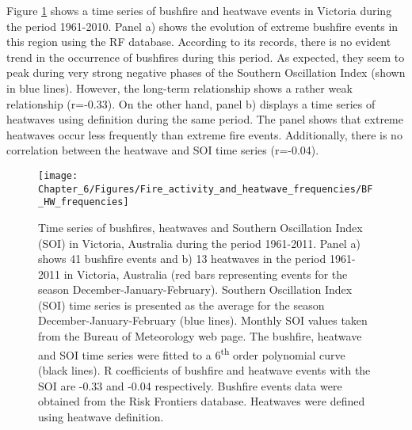 Figure \ref{fig:Time series of bushfires, heatwaves and Southern Oscillation Index (SOI) in Victoria, Australia during the period 1961-2011 (r)}
shows a time series of bushfire and heatwave events in Victoria during
the period 1961-2010. Panel a) shows the evolution of extreme bushfire
events in this region using the RF database. According to its records,
there is no evident trend in the occurrence of bushfires during this
period. As expected, they seem to peak during very strong negative
phases of the Southern Oscillation Index (shown in blue lines). However,
the long-term relationship shows a rather weak relationship (r=-0.33).
On the other hand, panel b) displays a time series of heatwaves using
\citet{Pezza2012} definition during the same period. The panel shows
that extreme heatwaves occur less frequently than extreme fire events.
Additionally, there is no correlation between the heatwave and SOI
time series (r=-0.04). 

\begin{figure}[h]
\noindent \begin{centering}
\texttt{[image: Chapter\_6/Figures/Fire\_activity\_and\_heatwave\_frequencies/BF\_HW\_frequencies]}
\par\end{centering}

\caption[Time series of bushfires, heatwaves and Southern Oscillation Index
(SOI) in Victoria, Australia during the period 1961-2011]{Time series of bushfires, heatwaves and Southern Oscillation Index
(SOI) in Victoria, Australia during the period 1961-2011. Panel a)
shows 41 bushfire events and b) 13 heatwaves in the period 1961-2011
in Victoria, Australia (red bars representing events for the season
December-January-February). Southern Oscillation Index (SOI) time
series is presented as the average for the season December-January-February
(blue lines). Monthly SOI values taken from the Bureau of Meteorology
web page. The bushfire, heatwave and SOI time series were fitted to
a 6\protect\textsuperscript{th} order polynomial curve (black lines).
R coefficients of bushfire and heatwave events with the SOI are -0.33
and -0.04 respectively. Bushfire events data were obtained from the
Risk Frontiers database. Heatwaves were defined using \citet{Pezza2012}
heatwave definition. \label{fig:Time series of bushfires, heatwaves and Southern Oscillation Index (SOI) in Victoria, Australia during the period 1961-2011 (r)}}


\end{figure}



